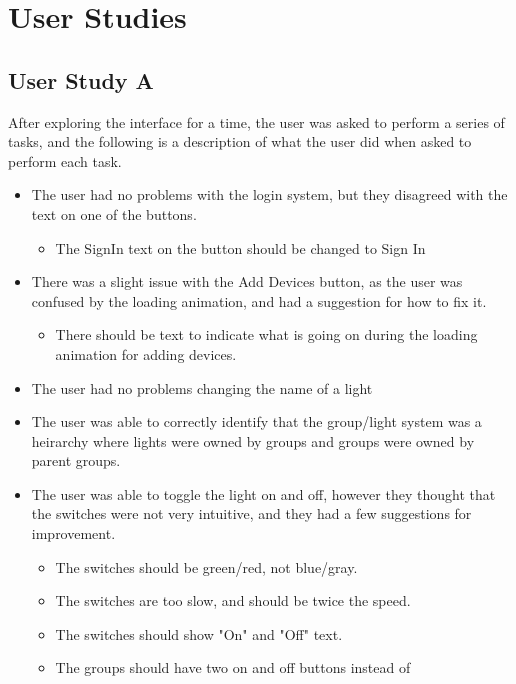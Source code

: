 \documentclass[oneside,openright]{book}
\begin{document}
\section{User Studies}

\subsection{User Study A}

After exploring the interface for a time, the user was asked to perform a
series of tasks, and the following is a description of what the user did when
asked to perform each task.

\begin{itemize}
    \item The user had no problems with the login system, but they disagreed
        with the text on one of the buttons.
        \begin{itemize}
            \item The SignIn text on the button should be changed to Sign In
        \end{itemize}
    \item There was a slight issue with the Add Devices button, as the user was
        confused by the loading animation, and had a suggestion for how to fix
        it.
        \begin{itemize}
            \item There should be text to indicate what is going on during the
                loading animation for adding devices.
        \end{itemize}
    \item The user had no problems changing the name of a light
    \item The user was able to correctly identify that the group/light system
        was a heirarchy where lights were owned by groups and groups were owned
        by parent groups.
    \item The user was able to toggle the light on and off, however they
        thought that the switches were not very intuitive, and they had a few
        suggestions for improvement.
        \begin{itemize}
            \item The switches should be green/red, not blue/gray.
            \item The switches are too slow, and should be twice the speed.
            \item The switches should show "On" and "Off" text.
            \item The groups should have two on and off buttons instead of

\end{itemize}
\end{itemize}
\end{document}

